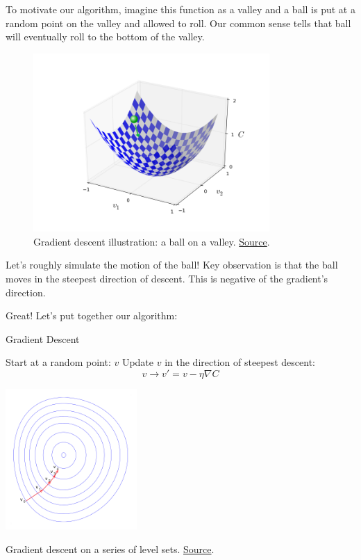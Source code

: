 \documentclass[a4paper]{tufte-handout}
\begin{document}
To motivate our algorithm, imagine this function as a valley and a ball
is put at a random point on the valley and allowed to roll. Our common
sense tells that ball will eventually roll to the bottom of the valley.

\begin{figure}
  \includegraphics[width=90mm]{valley_with_ball}
  \caption{Gradient descent illustration: a ball on a valley.
\href{http://neuralnetworksanddeeplearning.com/chap1.html}{Source}.}
\end{figure}

Let's roughly simulate the motion of the ball! Key observation is that
the ball moves in the steepest direction of descent. This is negative
of the gradient's direction.

Great! Let's put together our algorithm:

\begin{algorithm}
\caption{Gradient Descent}
\begin{algorithmic}[1]
  \STATE Start at a random point: \(v\)
  \STATE Update \(v\) in the direction of steepest descent: 
      \[v \rightarrow v' = v -\eta \nabla C\]
  \ENDWHILE
\end{algorithmic}
\end{algorithm}

\begin{marginfigure}
  \includegraphics[width=50mm]{Gradient_descent}
  \caption{Gradient descent on a series of level sets.
  \href{https://en.wikipedia.org/wiki/Gradient_descent}{Source}.}
\end{marginfigure}
\end{document}
